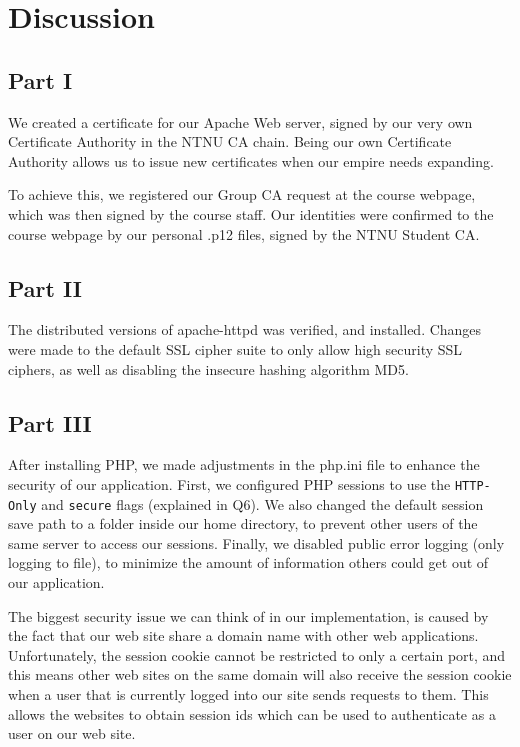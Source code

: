 \section{Discussion}

\subsection{Part I}

We created a certificate for our Apache Web server, signed by our very own Certificate Authority in the NTNU CA chain.
Being our own Certificate Authority allows us to issue new certificates when our empire needs expanding.

To achieve this, we registered our Group CA request at the course webpage, which was then signed by the course staff.
Our identities were confirmed to the course webpage by our personal .p12 files, signed by the NTNU Student CA.

\subsection{Part II}

The distributed versions of apache-httpd was verified, and installed.
Changes were made to the default SSL cipher suite to only allow high security SSL ciphers, as well as disabling the insecure hashing algorithm MD5.

\subsection{Part III}

After installing PHP, we made adjustments in the php.ini file to enhance the security of our application.
First, we configured PHP sessions to use the \verb/HTTP-Only/ and \verb/secure/ flags (explained in Q6).
We also changed the default session save path to a folder inside our home directory, to prevent other users of the same server to access our sessions.
Finally, we disabled public error logging (only logging to file), to minimize the amount of information others could get out of our application.

The biggest security issue we can think of in our implementation, is caused by the fact that our web site share a domain name with other web applications.
Unfortunately, the session cookie cannot be restricted to only a certain port, and this means other web sites on the same domain will also receive the session cookie when a user that is currently logged into our site sends requests to them.
This allows the websites to obtain session ids which can be used to authenticate as a user on our web site.
